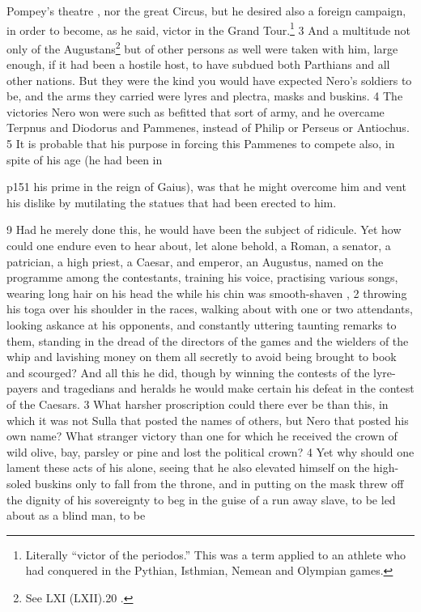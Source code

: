 Pompey's theatre , nor the great Circus, but he desired also a foreign campaign, in order to become, as he said, victor in the Grand Tour.\texthebrew{⁠}\footnote{Literally ``victor of the periodos.'' This was a term applied to an athlete who had conquered in the Pythian, Isthmian, Nemean and Olympian games.

} 3 And a multitude not only of the Augustans\texthebrew{⁠}\footnote{See LXI (LXII).20 .

} but of other persons as well were taken with him, large enough, if it had been a hostile host, to have subdued both Parthians and all other nations. But they were the kind you would have expected Nero's soldiers to be, and the arms they carried were lyres and plectra, masks and buskins. 4 The victories Nero won were such as befitted that sort of army, and he overcame Terpnus and Diodorus and Pammenes, instead of Philip or Perseus or Antiochus. 5 It is probable that his purpose in forcing this Pammenes to compete also, in spite of his age (he had been in

p151 his prime in the reign of Gaius), was that he might overcome him and vent his dislike by mutilating the statues that had been erected to him.

9
Had he merely done this, he would have been the subject of ridicule. Yet how could one endure even to hear about, let alone behold, a Roman, a senator, a patrician, a high priest, a Caesar, and emperor, an Augustus, named on the programme among the contestants, training his voice, practising various songs, wearing long hair on his head the while his chin was smooth-shaven , 2 throwing his toga over his shoulder in the races, walking about with one or two attendants, looking askance at his opponents, and constantly uttering taunting remarks to them, standing in the dread of the directors of the games and the wielders of the whip and lavishing money on them all secretly to avoid being brought to book and scourged? And all this he did, though by winning the contests of the lyre-payers and tragedians and heralds he would make certain his defeat in the contest of the Caesars. 3 What harsher proscription could there ever be than this, in which it was not Sulla that posted the names of others, but Nero that posted his own name? What stranger victory than one for which he received the crown of wild olive, bay, parsley or pine and lost the political crown? 4 Yet why should one lament these acts of his alone, seeing that he also elevated himself on the high-soled buskins only to fall from the throne, and in putting on the mask threw off the dignity of his sovereignty to beg in the guise of a run away slave, to be led about as a blind man, to be

